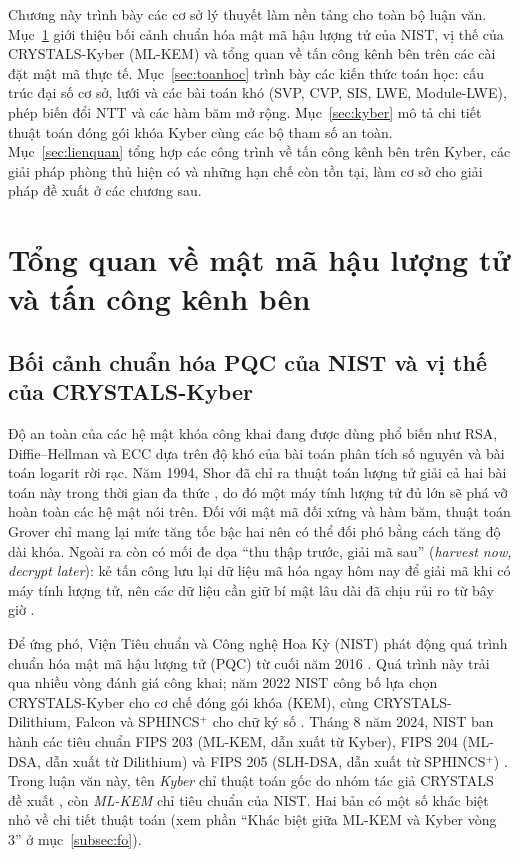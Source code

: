 \documentclass[../LuanVan.tex]{subfiles}
\begin{document}
Chương này trình bày các cơ sở lý thuyết làm nền tảng cho toàn bộ luận văn. Mục~\ref{sec:pqc} giới thiệu bối cảnh chuẩn hóa mật mã hậu lượng tử của NIST, vị thế của CRYSTALS-Kyber (ML-KEM) và tổng quan về tấn công kênh bên trên các cài đặt mật mã thực tế. Mục~\ref{sec:toanhoc} trình bày các kiến thức toán học: cấu trúc đại số cơ sở, lưới và các bài toán khó (SVP, CVP, SIS, LWE, Module-LWE), phép biến đổi NTT và các hàm băm mở rộng. Mục~\ref{sec:kyber} mô tả chi tiết thuật toán đóng gói khóa Kyber cùng các bộ tham số an toàn. Mục~\ref{sec:lienquan} tổng hợp các công trình về tấn công kênh bên trên Kyber, các giải pháp phòng thủ hiện có và những hạn chế còn tồn tại, làm cơ sở cho giải pháp đề xuất ở các chương sau.

\section{Tổng quan về mật mã hậu lượng tử và tấn công kênh bên}\label{sec:pqc}
\subsection{Bối cảnh chuẩn hóa PQC của NIST và vị thế của CRYSTALS-Kyber}\label{subsec:nist}

Độ an toàn của các hệ mật khóa công khai đang được dùng phổ biến như RSA, Diffie--Hellman và ECC dựa trên độ khó của bài toán phân tích số nguyên và bài toán logarit rời rạc. Năm 1994, Shor đã chỉ ra thuật toán lượng tử giải cả hai bài toán này trong thời gian đa thức \cite{Shor94}, do đó một máy tính lượng tử đủ lớn sẽ phá vỡ hoàn toàn các hệ mật nói trên. Đối với mật mã đối xứng và hàm băm, thuật toán Grover chỉ mang lại mức tăng tốc bậc hai nên có thể đối phó bằng cách tăng độ dài khóa. Ngoài ra còn có mối đe dọa ``thu thập trước, giải mã sau'' (\textit{harvest now, decrypt later}): kẻ tấn công lưu lại dữ liệu mã hóa ngay hôm nay để giải mã khi có máy tính lượng tử, nên các dữ liệu cần giữ bí mật lâu dài đã chịu rủi ro từ bây giờ \cite{Mosca18}.

Để ứng phó, Viện Tiêu chuẩn và Công nghệ Hoa Kỳ (NIST) phát động quá trình chuẩn hóa mật mã hậu lượng tử (PQC) từ cuối năm 2016 \cite{NIST16CFP}. Quá trình này trải qua nhiều vòng đánh giá công khai; năm 2022 NIST công bố lựa chọn CRYSTALS-Kyber cho cơ chế đóng gói khóa (KEM), cùng CRYSTALS-Dilithium, Falcon và SPHINCS$^+$ cho chữ ký số \cite{NISTIR8413}. Tháng 8 năm 2024, NIST ban hành các tiêu chuẩn FIPS 203 (ML-KEM, dẫn xuất từ Kyber), FIPS 204 (ML-DSA, dẫn xuất từ Dilithium) và FIPS 205 (SLH-DSA, dẫn xuất từ SPHINCS$^+$) \cite{FIPS203,FIPS204,FIPS205}. Trong luận văn này, tên \textit{Kyber} chỉ thuật toán gốc do nhóm tác giả CRYSTALS đề xuất \cite{Bos18,Avanzi21}, còn \textit{ML-KEM} chỉ tiêu chuẩn của NIST. Hai bản có một số khác biệt nhỏ về chi tiết thuật toán (xem phần ``Khác biệt giữa ML-KEM và Kyber vòng 3'' ở mục~\ref{subsec:fo}).
\end{document}
